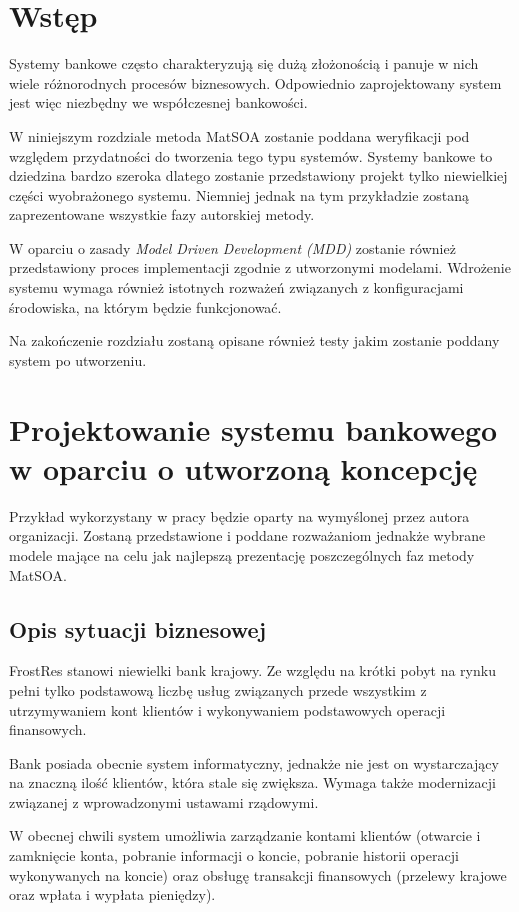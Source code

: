 \section{Wstęp}
Systemy bankowe często charakteryzują się dużą złożonością i panuje w nich wiele różnorodnych procesów biznesowych. Odpowiednio zaprojektowany system jest więc niezbędny we współczesnej bankowości.
 
W niniejszym rozdziale metoda MatSOA zostanie poddana weryfikacji pod względem przydatności do tworzenia tego typu systemów. Systemy bankowe to dziedzina bardzo szeroka dlatego zostanie przedstawiony projekt tylko niewielkiej części wyobrażonego systemu. Niemniej jednak na tym przykładzie zostaną zaprezentowane wszystkie fazy autorskiej metody.

W oparciu o zasady \emph{Model Driven Development (MDD)} zostanie również przedstawiony proces implementacji zgodnie z utworzonymi modelami. Wdrożenie systemu wymaga również istotnych rozważeń związanych z konfiguracjami środowiska, na którym będzie funkcjonować. 

Na zakończenie rozdziału zostaną opisane również testy jakim zostanie poddany system po utworzeniu.

\section{Projektowanie systemu bankowego w oparciu o utworzoną koncepcję}
Przykład wykorzystany w pracy będzie oparty na wymyślonej przez autora organizacji. Zostaną przedstawione i poddane rozważaniom jednakże wybrane modele mające na celu jak najlepszą prezentację poszczególnych faz metody MatSOA.

\subsection{Opis sytuacji biznesowej}
FrostRes stanowi niewielki bank krajowy. Ze względu na krótki pobyt na rynku pełni tylko podstawową liczbę usług związanych przede wszystkim z utrzymywaniem kont klientów i wykonywaniem podstawowych operacji finansowych. 
 
Bank posiada obecnie system informatyczny, jednakże nie jest on wystarczający na znaczną ilość klientów, która stale się zwiększa. Wymaga także modernizacji związanej z wprowadzonymi ustawami rządowymi.  

W obecnej chwili system umożliwia zarządzanie kontami klientów (otwarcie i zamknięcie konta, pobranie informacji o koncie, pobranie historii operacji wykonywanych na koncie) oraz obsługę transakcji finansowych (przelewy krajowe oraz wpłata i wypłata pieniędzy). 

